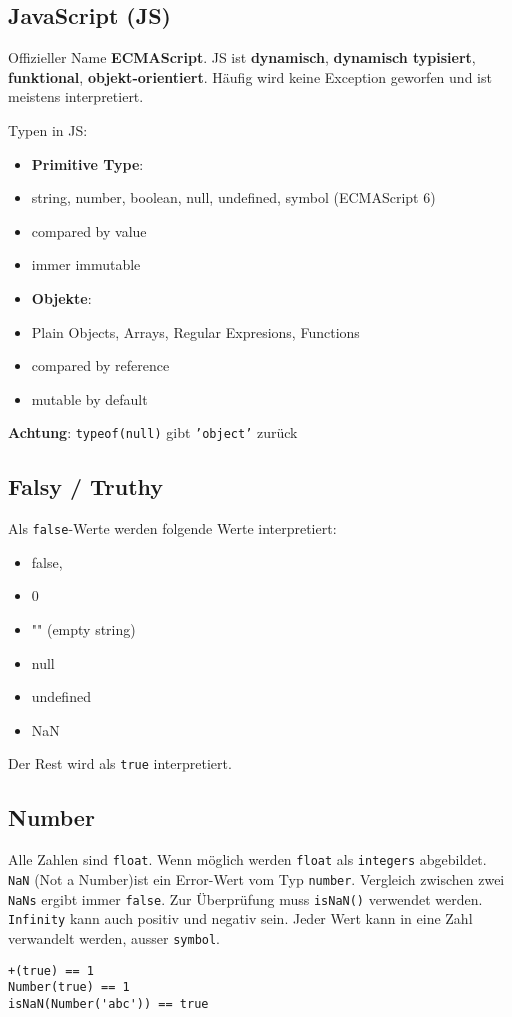 \documentclass[11pt,twoside,landscape]{article}
\begin{document}
\begin{multicols}{4}
\section{JavaScript (JS)}
\label{sec:org6c6f20b}
Offizieller Name \textbf{ECMAScript}. JS ist \textbf{dynamisch},  \textbf{dynamisch typisiert}, \textbf{funktional}, \textbf{objekt-orientiert}. Häufig wird keine Exception geworfen und ist meistens interpretiert. 

Typen in JS:
\begin{itemize}
\item \textbf{Primitive Type}:
\item string, number, boolean, null, undefined, symbol (ECMAScript 6)
\item compared by value
\item immer immutable

\item \textbf{Objekte}:
\item Plain Objects, Arrays, Regular Expresions, Functions
\item compared by reference
\item mutable by default
\end{itemize}


\textbf{Achtung}: \texttt{typeof(null)} gibt \texttt{'object'} zurück

\subsection{Falsy / Truthy}
\label{sec:org2ba6821}
Als \texttt{false}-Werte werden folgende Werte interpretiert:
\begin{itemize}
\item false,
\item 0
\item "" (empty string)
\item null
\item undefined
\item NaN
\end{itemize}

Der Rest wird als \texttt{true}  interpretiert.

\subsection{Number}
\label{sec:org79b8829}
Alle Zahlen sind \texttt{float}. Wenn möglich werden \texttt{float} als \texttt{integers} abgebildet. \texttt{NaN} (Not a Number)ist ein Error-Wert vom Typ \texttt{number}. Vergleich zwischen zwei \texttt{NaNs} ergibt immer \texttt{false}. Zur Überprüfung muss \texttt{isNaN()} verwendet werden. \texttt{Infinity} kann auch positiv und negativ sein. Jeder Wert kann in eine Zahl verwandelt werden, ausser \texttt{symbol}.
\lstset{language=js,label= ,caption= ,captionpos=b,numbers=none}
\begin{lstlisting}
+(true) == 1
Number(true) == 1
isNaN(Number('abc')) == true
\end{lstlisting}


\end{multicols}
\end{document}
